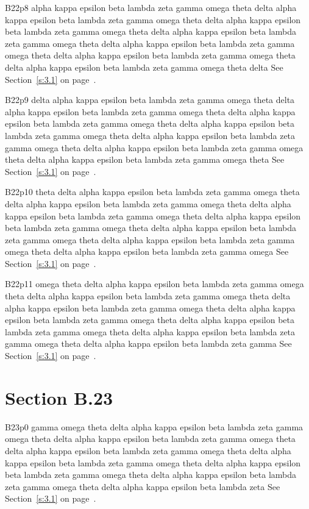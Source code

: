 B22p8 alpha kappa epsilon beta lambda zeta gamma omega theta delta alpha kappa epsilon beta lambda zeta gamma omega theta delta alpha kappa epsilon beta lambda zeta gamma omega theta delta alpha kappa epsilon beta lambda zeta gamma omega theta delta alpha kappa epsilon beta lambda zeta gamma omega theta delta alpha kappa epsilon beta lambda zeta gamma omega theta delta alpha kappa epsilon beta lambda zeta gamma omega theta delta See Section~\ref{s:3.1} on page~\pageref{s:3.1}.

B22p9 delta alpha kappa epsilon beta lambda zeta gamma omega theta delta alpha kappa epsilon beta lambda zeta gamma omega theta delta alpha kappa epsilon beta lambda zeta gamma omega theta delta alpha kappa epsilon beta lambda zeta gamma omega theta delta alpha kappa epsilon beta lambda zeta gamma omega theta delta alpha kappa epsilon beta lambda zeta gamma omega theta delta alpha kappa epsilon beta lambda zeta gamma omega theta See Section~\ref{s:3.1} on page~\pageref{s:3.1}.

B22p10 theta delta alpha kappa epsilon beta lambda zeta gamma omega theta delta alpha kappa epsilon beta lambda zeta gamma omega theta delta alpha kappa epsilon beta lambda zeta gamma omega theta delta alpha kappa epsilon beta lambda zeta gamma omega theta delta alpha kappa epsilon beta lambda zeta gamma omega theta delta alpha kappa epsilon beta lambda zeta gamma omega theta delta alpha kappa epsilon beta lambda zeta gamma omega See Section~\ref{s:3.1} on page~\pageref{s:3.1}.

B22p11 omega theta delta alpha kappa epsilon beta lambda zeta gamma omega theta delta alpha kappa epsilon beta lambda zeta gamma omega theta delta alpha kappa epsilon beta lambda zeta gamma omega theta delta alpha kappa epsilon beta lambda zeta gamma omega theta delta alpha kappa epsilon beta lambda zeta gamma omega theta delta alpha kappa epsilon beta lambda zeta gamma omega theta delta alpha kappa epsilon beta lambda zeta gamma See Section~\ref{s:3.1} on page~\pageref{s:3.1}.

\section{Section B.23}\label{s:B.23}
B23p0 gamma omega theta delta alpha kappa epsilon beta lambda zeta gamma omega theta delta alpha kappa epsilon beta lambda zeta gamma omega theta delta alpha kappa epsilon beta lambda zeta gamma omega theta delta alpha kappa epsilon beta lambda zeta gamma omega theta delta alpha kappa epsilon beta lambda zeta gamma omega theta delta alpha kappa epsilon beta lambda zeta gamma omega theta delta alpha kappa epsilon beta lambda zeta See Section~\ref{s:3.1} on page~\pageref{s:3.1}.

